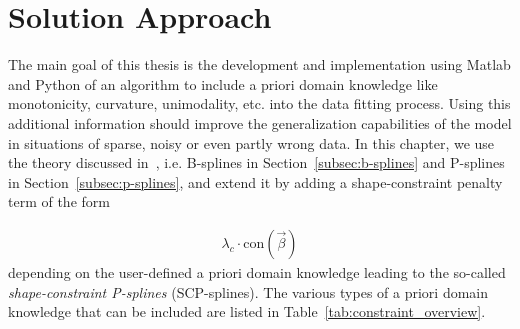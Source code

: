 \chapter{Solution Approach} \label{cha:solution-approach}

The main goal of this thesis is the development and implementation using Matlab and Python of an algorithm to include a priori domain knowledge like monotonicity, curvature, unimodality, etc. into the data fitting process. Using  this additional information should improve the generalization capabilities of the model in situations of sparse, noisy or even partly wrong data. In this chapter, we use the theory discussed in~, i.e. B-splines in Section~\ref{subsec:b-splines} and P-splines in Section~\ref{subsec:p-splines}, and extend it by adding a shape-constraint penalty term of the form 

\begin{align} \label{eq:constraint-penalty-term}
	\lambda_c \cdot \text{con}(\vec{\beta})
\end{align} 
%
depending on the user-defined a priori domain knowledge leading to the so-called \emph{shape-constraint P-splines} (SCP-splines). The various types of a priori domain knowledge that can be included are listed in Table~\ref{tab:constraint_overview}.

